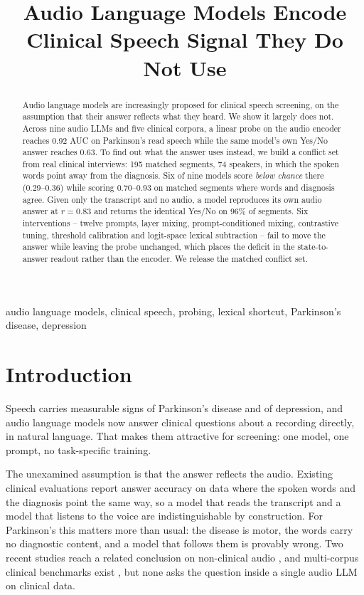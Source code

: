 \documentclass{article}
\title{Audio Language Models Encode Clinical Speech Signal They Do Not Use}
\begin{document}
\maketitle

\begin{abstract}
Audio language models are increasingly proposed for clinical speech screening, on the
assumption that their answer reflects what they heard. We show it largely does not. Across
nine audio LLMs and five clinical corpora, a linear probe on the audio encoder reaches
0.92 AUC on Parkinson's read speech while the same model's own Yes/No answer reaches 0.63.
To find out what the answer uses instead, we build a conflict set from real clinical
interviews: 195 matched segments, 74 speakers, in which the spoken words point away from
the diagnosis. Six of nine models score \emph{below chance} there (0.29--0.36) while scoring
0.70--0.93 on matched segments where words and diagnosis agree. Given only the transcript and
no audio, a model reproduces its own audio answer at $r=0.83$ and returns the identical Yes/No
on 96\% of segments. Six interventions -- twelve prompts, layer mixing, prompt-conditioned
mixing, contrastive tuning, threshold calibration and logit-space lexical subtraction -- fail
to move the answer while leaving the probe unchanged, which places the deficit in the
state-to-answer readout rather than the encoder. We release the matched conflict set.
\end{abstract}

\begin{keywords}
audio language models, clinical speech, probing, lexical shortcut, Parkinson's disease, depression
\end{keywords}

\section{Introduction}\label{sec:intro}

Speech carries measurable signs of Parkinson's disease and of depression, and audio language
models now answer clinical questions about a recording directly, in natural language. That
makes them attractive for screening: one model, one prompt, no task-specific training.

The unexamined assumption is that the answer reflects the audio. Existing clinical evaluations
report answer accuracy on data where the spoken words and the diagnosis point the same way, so
a model that reads the transcript and a model that listens to the voice are indistinguishable
by construction. For Parkinson's this matters more than usual: the disease is motor, the words
carry no diagnostic content, and a model that follows them is provably wrong. Two recent
studies reach a related conclusion on non-clinical audio \cite{listen2026,voxparadox2026}, and
multi-corpus clinical benchmarks exist \cite{speechdx2026,fend2025}, but none asks the question
inside a single audio LLM on clinical data.
\end{document}
